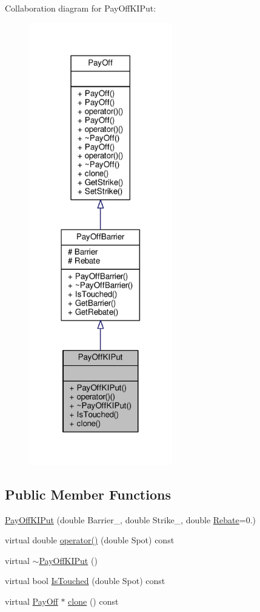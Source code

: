 Collaboration diagram for Pay\+Off\+K\+I\+Put\+:
\nopagebreak
\begin{figure}[H]
\begin{center}
\leavevmode
\includegraphics[width=177pt]{classPayOffKIPut__coll__graph}
\end{center}
\end{figure}
\subsection*{Public Member Functions}
\begin{DoxyCompactItemize}
\item 
\hyperlink{classPayOffKIPut_a950d8affcaf671b3e9c252b2fa065009}{Pay\+Off\+K\+I\+Put} (double Barrier\+\_\+, double Strike\+\_\+, double \hyperlink{classPayOffBarrier_aca3ea631dcdb28a1df971b74774e41f8}{Rebate}=0.)
\item 
virtual double \hyperlink{classPayOffKIPut_a50dc6bc5327116097c208ae470567b86}{operator()} (double Spot) const
\item 
virtual \hyperlink{classPayOffKIPut_ab054b919f93b3e5d82fe96f9a229e08d}{$\sim$\+Pay\+Off\+K\+I\+Put} ()
\item 
virtual bool \hyperlink{classPayOffKIPut_a0f62d8559620b09b97f31ce052ad061c}{Is\+Touched} (double Spot) const
\item 
virtual \hyperlink{classPayOff}{Pay\+Off} $\ast$ \hyperlink{classPayOffKIPut_ae6a387c91133eedbe19600bb7b455a48}{clone} () const
\end{DoxyCompactItemize}
